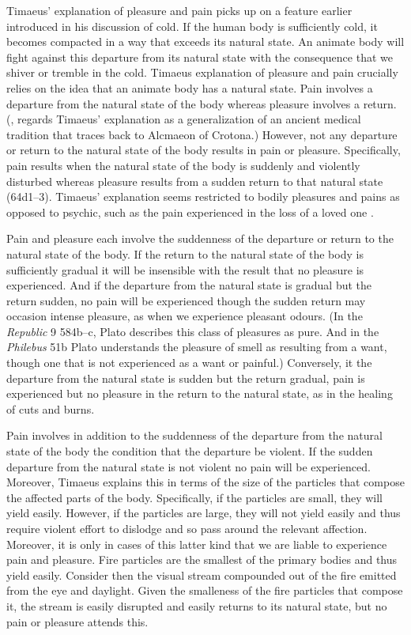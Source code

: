 Timaeus' explanation of pleasure and pain picks up on a feature earlier introduced in his discussion of cold. If the human body is sufficiently cold, it becomes compacted in a way that exceeds its natural state. An animate body will fight against this departure from its natural state with the consequence that we shiver or tremble in the cold. Timaeus explanation of pleasure and pain crucially relies on the idea that an animate body has a natural state. Pain involves a departure from the natural state of the body whereas pleasure involves a return. (\citealt[448--9]{Taylor:1928qb}, regards Timaeus' explanation as a generalization of an ancient medical tradition that traces back to Alcmaeon of Crotona.) However, not any departure or return to the natural state of the body results in pain or pleasure. Specifically, pain results when the natural state of the body is suddenly and violently disturbed whereas pleasure results from a sudden return to that natural state (64d1--3). Timaeus' explanation seems restricted to bodily pleasures and pains as opposed to psychic, such as the pain experienced in the loss of a loved one \citep[447--8]{Taylor:1928qb}.

Pain and pleasure each involve the suddenness of the departure or return to the natural state of the body. If the return to the natural state of the body is sufficiently gradual it will be insensible with the result that no pleasure is experienced. And if the departure from the natural state is gradual but the return sudden, no pain will be experienced though the sudden return may occasion intense pleasure, as when we experience pleasant odours. (In the \emph{Republic} 9 584b--c, Plato describes this class of pleasures as pure. And in the \emph{Philebus} 51b Plato understands the pleasure of smell as resulting from a want, though one that is not experienced as a want or painful.) Conversely, it the departure from the natural state is sudden but the return gradual, pain is experienced but no pleasure in the return to the natural state, as in the healing of cuts and burns.

Pain involves in addition to the suddenness of the departure from the natural state of the body the condition that the departure be violent. If the sudden departure from the natural state is not violent no pain will be experienced. Moreover, Timaeus explains this in terms of the size of the particles that compose the affected parts of the body. Specifically, if the particles are small, they will yield easily. However, if the particles are large, they will not yield easily and thus require violent effort to dislodge and so pass around the relevant affection. Moreover, it is only in cases of this latter kind that we are liable to experience pain and pleasure. Fire particles are the smallest of the primary bodies and thus yield easily. Consider then the visual stream compounded out of the fire emitted from the eye and daylight. Given the smalleness of the fire particles that compose it, the stream is easily disrupted and easily returns to its natural state, but no pain or pleasure attends this.

